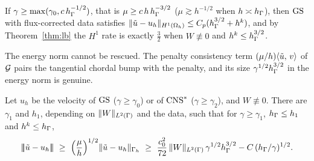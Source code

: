 \begin{corollary}[Rescue in $H^1$]\label{cor:rescue}
If $\gamma\ge\max(\gamma_0,c\,h_\Gamma^{-1/2})$, that is $\mu\ge c\,h\,h_\Gamma^{-3/2}$ ($\mu\gtrsim h^{-1/2}$ when $h\asymp h_\Gamma$), then $\mathrm{GS}$ with flux-corrected data satisfies $\lVert \tilde u-u_h\rVert_{H^1(\Omega_h)}\le C_p(h_\Gamma^{3/2}+h^k)$, and by Theorem~\ref{thm:lb} the $H^1$ rate is exactly $\frac32$ when $W\not\equiv0$ and $h^k\le h_\Gamma^{3/2}$.
\end{corollary}

The energy norm cannot be rescued. The penalty consistency term $(\mu/h)\langle \tilde u,\, v\rangle$ of $\mathcal G$ pairs the tangential chordal bump with the penalty, and its size $\gamma^{1/2}h_\Gamma^{3/2}$ in the energy norm is genuine.

\begin{theorem}\label{thm:elower}
Let $u_h$ be the velocity of $\mathrm{GS}$ ($\gamma\ge\gamma_0$) or of $\mathrm{CNS}^\ast$ ($\gamma\ge\gamma_2$), and $W\not\equiv0$. There are $\gamma_1$ and $h_1$, depending on $\lVert W\rVert_{L^2(\Gamma)}$ and the data, such that for $\gamma\ge\gamma_1$, $h_\Gamma\le h_1$ and $h^k\le h_\Gamma$,
\[
\tnorm{\ut-u_h}\ \ge\ \Bigl(\frac\mu h\Bigr)^{1/2}\norm{\ut-u_h}_{\Gh}\ \ge\ \frac{c_0^2}{72}\,\norm{W}_{L^2(\Gamma)}\,\gamma^{1/2}\hG^{3/2}-C\,(\hG/\gamma)^{1/2}.
\]
\end{theorem}

